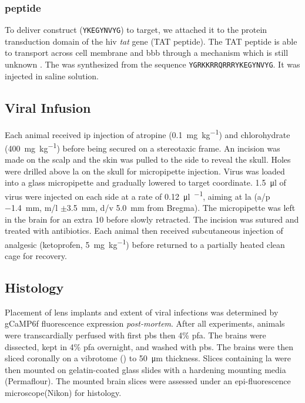 \subsubsection{\tglu peptide}
To deliver \glu construct (\texttt{YKEGYNVYG}) to target, we attached it to the protein transduction domain of the \gls{hiv} \textit{tat} gene (TAT peptide). The TAT peptide is able to transport across cell membrane and \gls{bbb} through a mechanism which is still unknown . The \tglu was synthesized from the sequence \texttt{YGRKKRRQRRRYKEGYNVYG}. It was injected in saline solution.


\subsection{Viral Infusion}

Each animal received \gls{ip} injection of atropine (\SI{0.1}{\mg\per\kg}) and chlorohydrate (\SI{400}{\mg\per\kg}) before being secured on a stereotaxic frame. An incision was made on the scalp and the skin was pulled to the side to reveal the skull. Holes were drilled above \gls{la} on the skull for micropipette injection. Virus was loaded into a glass micropipette and gradually lowered to target coordinate. \SI{1.5}{\ul} of virus were injected on each side at a rate of \SI{0.12}{\ul\per\min}, aiming at \gls{la} (\gls{a/p} \SI{-1.4}{\mm}, \gls{m/l} $\pm$\SI{3.5}{\mm}, \gls{d/v} \SI{5.0}{\mm} from Bregma). The micropipette was left in the brain for an extra \SI{10}{\min} before slowly retracted. The incision was sutured and treated with antibiotics. Each animal then received subcutaneous injection of analgesic (ketoprofen, \SI{5}{\mg\per\kg}) before returned to a partially heated clean cage for recovery.

\subsection{Histology}
Placement of lens implants and extent of viral infections was determined by gCaMP6f fluorescence expression \textit{post-mortem}. After all experiments, animals were transcardially perfused with first \gls{pbs} then 4\% \gls{pfa}. The brains were dissected,  kept in 4\% \gls{pfa} overnight, and washed with \gls{pbs}. The brains were then sliced coronally on a vibrotome () to \SI{50}{\um} thickness. Slices containing \gls{la} were then mounted on gelatin-coated glass slides with a hardening mounting media (Permaflour). The mounted brain slices were assessed under an epi-fluorescence microscope(Nikon) for histology.


